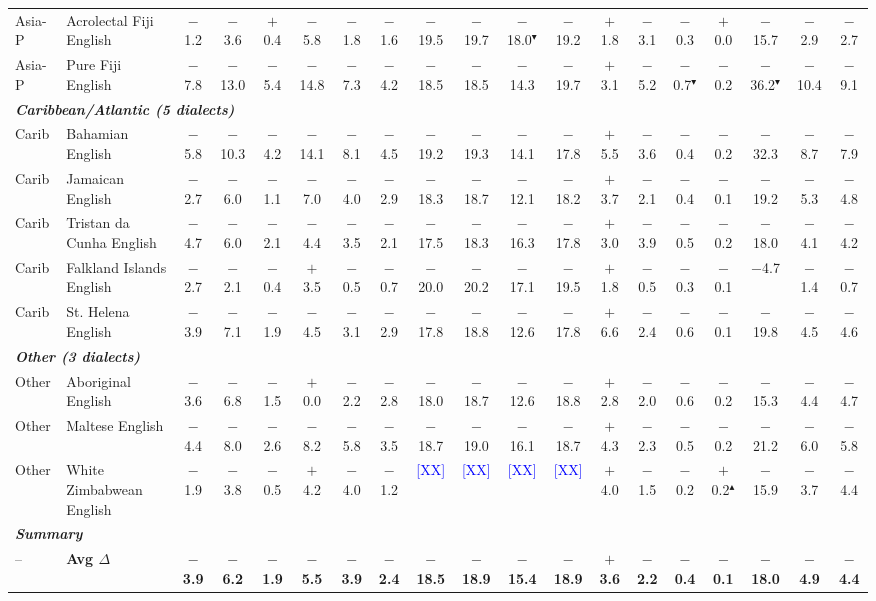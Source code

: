 \begin{table}[t]
\begin{tabular}{llccccccccccccccccc}
Asia-P & Acrolectal Fiji English & $-$1.2 & $-$3.6 & $+$0.4 & $-$5.8 & $-$1.8 & $-$1.6 & $-$19.5 & $-$19.7 & $-$18.0$^\blacktriangledown$ & $-$19.2 & $+$1.8 & $-$3.1 & $-$0.3 & $+$0.0 & $-$15.7 & $-$2.9 & $-$2.7 \\
Asia-P & Pure Fiji English & $-$7.8 & $-$13.0 & $-$5.4 & $-$14.8 & $-$7.3 & $-$4.2 & $-$18.5 & $-$18.5 & $-$14.3 & $-$19.7 & $+$3.1 & $-$5.2 & $-$0.7$^\blacktriangledown$ & $-$0.2 & $-$36.2$^\blacktriangledown$ & $-$10.4 & $-$9.1 \\
\midrule
\multicolumn{19}{l}{\textit{\textbf{Caribbean/Atlantic (5 dialects)}}} \\
Carib & Bahamian English & $-$5.8 & $-$10.3 & $-$4.2 & $-$14.1 & $-$8.1 & $-$4.5 & $-$19.2 & $-$19.3 & $-$14.1 & $-$17.8 & $+$5.5 & $-$3.6 & $-$0.4 & $-$0.2 & $-$32.3 & $-$8.7 & $-$7.9 \\
Carib & Jamaican English & $-$2.7 & $-$6.0 & $-$1.1 & $-$7.0 & $-$4.0 & $-$2.9 & $-$18.3 & $-$18.7 & $-$12.1 & $-$18.2 & $+$3.7 & $-$2.1 & $-$0.4 & $-$0.1 & $-$19.2 & $-$5.3 & $-$4.8 \\
Carib & Tristan da Cunha English & $-$4.7 & $-$6.0 & $-$2.1 & $-$4.4 & $-$3.5 & $-$2.1 & $-$17.5 & $-$18.3 & $-$16.3 & $-$17.8 & $+$3.0 & $-$3.9 & $-$0.5 & $-$0.2 & $-$18.0 & $-$4.1 & $-$4.2 \\
Carib & Falkland Islands English & $-$2.7 & $-$2.1 & $-$0.4 & $+$3.5 & $-$0.5 & $-$0.7 & $-$20.0 & $-$20.2 & $-$17.1 & $-$19.5 & $+$1.8 & $-$0.5 & $-$0.3 & $-$0.1 & $-$4.7 & $-$1.4 & $-$0.7 \\
Carib & St. Helena English & $-$3.9 & $-$7.1 & $-$1.9 & $-$4.5 & $-$3.1 & $-$2.9 & $-$17.8 & $-$18.8 & $-$12.6 & $-$17.8 & $+$6.6 & $-$2.4 & $-$0.6 & $-$0.1 & $-$19.8 & $-$4.5 & $-$4.6 \\
\midrule
\multicolumn{19}{l}{\textit{\textbf{Other (3 dialects)}}} \\
Other & Aboriginal English & $-$3.6 & $-$6.8 & $-$1.5 & $+$0.0 & $-$2.2 & $-$2.8 & $-$18.0 & $-$18.7 & $-$12.6 & $-$18.8 & $+$2.8 & $-$2.0 & $-$0.6 & $-$0.2 & $-$15.3 & $-$4.4 & $-$4.7 \\
Other & Maltese English & $-$4.4 & $-$8.0 & $-$2.6 & $-$8.2 & $-$5.8 & $-$3.5 & $-$18.7 & $-$19.0 & $-$16.1 & $-$18.7 & $+$4.3 & $-$2.3 & $-$0.5 & $-$0.2 & $-$21.2 & $-$6.0 & $-$5.8 \\
Other & White Zimbabwean English & $-$1.9 & $-$3.8 & $-$0.5 & $+$4.2 & $-$4.0 & $-$1.2 & \textcolor{blue}{[XX]} & \textcolor{blue}{[XX]} & \textcolor{blue}{[XX]} & \textcolor{blue}{[XX]} & $+$4.0 & $-$1.5 & $-$0.2 & $+$0.2$^\blacktriangle$ & $-$15.9 & $-$3.7 & $-$4.4 \\
\midrule
\multicolumn{19}{l}{\textit{\textbf{Summary}}} \\
-- & \textbf{Avg $\Delta$} & \textbf{$-$3.9} & \textbf{$-$6.2} & \textbf{$-$1.9} & \textbf{$-$5.5} & \textbf{$-$3.9} & \textbf{$-$2.4} & \textbf{$-$18.5} & \textbf{$-$18.9} & \textbf{$-$15.4} & \textbf{$-$18.9} & \textbf{$+$3.6} & \textbf{$-$2.2} & \textbf{$-$0.4} & \textbf{$-$0.1} & \textbf{$-$18.0} & \textbf{$-$4.9} & \textbf{$-$4.4} \\
\bottomrule
\end{tabular}
\end{table}